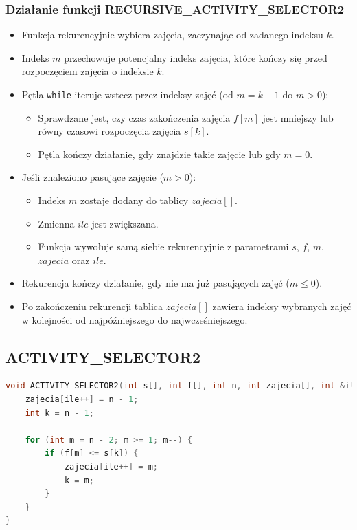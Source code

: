 \documentclass{article}
\begin{document}
		\subsubsection*{Działanie funkcji RECURSIVE\_ACTIVITY\_SELECTOR2}
		\begin{itemize}
			\item Funkcja rekurencyjnie wybiera zajęcia, zaczynając od zadanego indeksu $k$.
			\item Indeks $m$ przechowuje potencjalny indeks zajęcia, które kończy się przed rozpoczęciem zajęcia o indeksie $k$.
			\item Pętla \texttt{while} iteruje wstecz przez indeksy zajęć (od $m = k-1$ do $m > 0$):
			\begin{itemize}
				\item Sprawdzane jest, czy czas zakończenia zajęcia $f[m]$ jest mniejszy lub równy czasowi rozpoczęcia zajęcia $s[k]$.
				\item Pętla kończy działanie, gdy znajdzie takie zajęcie lub gdy $m = 0$.
			\end{itemize}
			\item Jeśli znaleziono pasujące zajęcie ($m > 0$):
			\begin{itemize}
				\item Indeks $m$ zostaje dodany do tablicy $zajecia[]$.
				\item Zmienna $ile$ jest zwiększana.
				\item Funkcja wywołuje samą siebie rekurencyjnie z parametrami $s$, $f$, $m$, $zajecia$ oraz $ile$.
			\end{itemize}
			\item Rekurencja kończy działanie, gdy nie ma już pasujących zajęć ($m \leq 0$).
			\item Po zakończeniu rekurencji tablica $zajecia[]$ zawiera indeksy wybranych zajęć w kolejności od najpóźniejszego do najwcześniejszego.
		\end{itemize}

	\subsection*{ACTIVITY\_SELECTOR2} 
\begin{lstlisting}[language=C++, tabsize=3, basicstyle=\footnotesize]
void ACTIVITY_SELECTOR2(int s[], int f[], int n, int zajecia[], int &ile) {
	zajecia[ile++] = n - 1; 
	int k = n - 1;
	
	for (int m = n - 2; m >= 1; m--) {
		if (f[m] <= s[k]) {
			zajecia[ile++] = m; 
			k = m;
		}
	}
}
\end{lstlisting}
		
\end{document}
